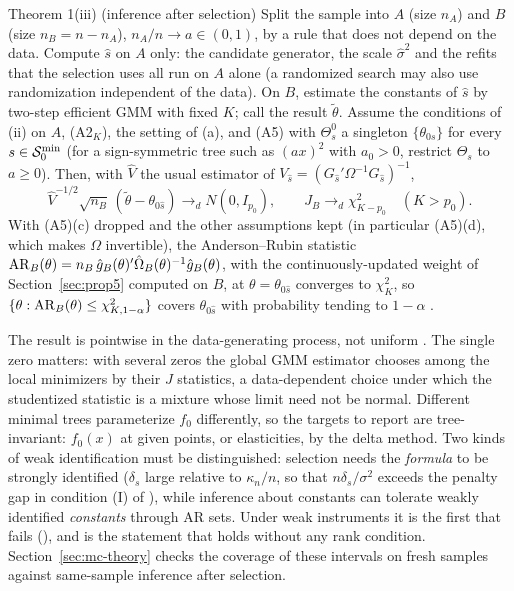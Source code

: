 \begin{result}{Theorem 1(iii) (inference after selection)}
Split the sample into $A$ (size $n_A$) and $B$ (size $n_B = n - n_A$), $n_A/n \to a \in (0,1)$, by a rule that does not depend on the data. Compute $\hat s$ on $A$ only: the candidate generator, the scale $\hat\sigma^2$ and the refits that the selection uses all run on $A$ alone (a randomized search may also use randomization independent of the data). On $B$, estimate the constants of $\hat s$ by two-step efficient GMM with fixed $K$; call the result $\tilde\theta$. Assume the conditions of (ii) on $A$, (A2$_K$), the setting of (a), and (A5) with $\Theta_s^0$ a singleton $\{\theta_{0s}\}$ for every $s \in \mathcal{S}_0^{\min}$ (for a sign-symmetric tree such as $(ax)^2$ with $a_0 > 0$, restrict $\Theta_s$ to $a \ge 0$). Then, with $\hat V$ the usual estimator of $V_{\hat s} = (G_{\hat s}'\Omega^{-1}G_{\hat s})^{-1}$,
\[
\hat V^{-1/2}\sqrt{n_B}\,(\tilde\theta - \theta_{0\hat s}) \to_d N(0, I_{p_0}), \qquad J_B \to_d \chi^2_{K - p_0}\quad (K > p_0).
\]
With (A5)(c) dropped and the other assumptions kept (in particular (A5)(d), which makes $\Omega$ invertible), the Anderson--Rubin statistic $\mathrm{AR}_B(\theta) = n_B\,\hat g_B(\theta)'\hat\Omega_B(\theta)^{-1}\hat g_B(\theta)$, with the continuously-updated weight of Section~\ref{sec:prop5} computed on $B$, at $\theta = \theta_{0\hat s}$ converges to $\chi^2_K$, so $\{\theta : \mathrm{AR}_B(\theta) \le \chi^2_{K,1-\alpha}\}$ covers $\theta_{0\hat s}$ with probability tending to $1 - \alpha$ \citep{stockwright2000}.
\end{result}

The result is pointwise in the data-generating process, not uniform \citep{leebpotscher2005}. The single zero matters: with several zeros the global GMM estimator chooses among the local minimizers by their $J$ statistics, a data-dependent choice under which the studentized statistic is a mixture whose limit need not be normal. Different minimal trees parameterize $f_0$ differently, so the targets to report are tree-invariant: $f_0(x)$ at given points, or elasticities, by the delta method. Two kinds of weak identification must be distinguished: selection needs the \emph{formula} to be strongly identified ($\delta_s$ large relative to $\kappa_n/n$, so that $n\delta_s/\sigma^2$ exceeds the penalty gap in condition (I) of ), while inference about constants can tolerate weakly identified \emph{constants} through AR sets. Under weak instruments it is the first that fails (), and  is the statement that holds without any rank condition. Section~\ref{sec:mc-theory} checks the coverage of these intervals on fresh samples against same-sample inference after selection.

